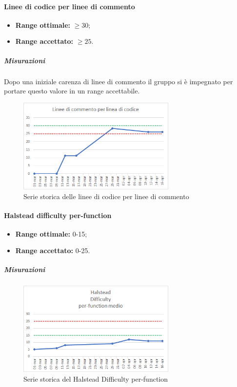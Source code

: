 			\paragraph{Linee di codice per linee di commento} \Spazio
			\begin{itemize}
				\item \textbf{Range ottimale:} $\geq30$;
				\item \textbf{Range accettato:} $\geq25$.
			\end{itemize}
		    \subparagraph{Misurazioni}
		     Dopo una iniziale carenza di linee di commento il gruppo si è impegnato per portare questo valore in un range accettabile.
		    \begin{figure}[H]
		   	\centering 
		    	\includegraphics[width=0.7\textwidth]{Images/comm.png}
		    	\caption{Serie storica delle linee di codice per linee di commento}
		    	\label{comm} 
		    \end{figure}
	        
			\paragraph{Halstead difficulty per-function} \Spazio
			\begin{itemize}
				\item \textbf{Range ottimale:} 0-15;
				\item \textbf{Range accettato:} 0-25.
			\end{itemize}
		\subparagraph{Misurazioni}
		\begin{figure}[H]
			\centering 
			\includegraphics[width=0.7\textwidth]{Images/H-difficulty.png}
			\caption{Serie storica del Halstead Difficulty per-function}
			\label{diff} 
		\end{figure}
